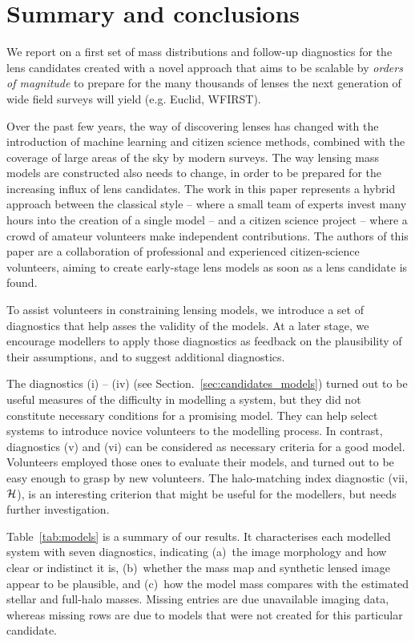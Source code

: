 
\section{Summary and conclusions}\label{sec:summary}


We report on a first set of mass distributions and follow-up
diagnostics for the {\SW} lens candidates created with a novel
approach that aims to be scalable by {\sl orders of magnitude} to
prepare for the many thousands of lenses the next generation of wide
field surveys will yield (e.g. Euclid, WFIRST).

Over the past few years, the way of discovering lenses has changed
with the introduction of machine learning and citizen science methods,
combined with the coverage of large areas of the sky by modern
surveys.  The way lensing mass models are constructed also needs to
change, in order to be prepared for the increasing influx of lens
candidates.  The work in this paper represents a hybrid approach
between the classical style -- where a small team of experts invest
many hours into the creation of a single model -- and a citizen
science project -- where a crowd of amateur volunteers make
independent contributions.  The authors of this paper are a
collaboration of professional and experienced citizen-science
volunteers, aiming to create early-stage lens models as soon as a lens
candidate is found.

To assist volunteers in constraining lensing models, we introduce a
set of diagnostics that help asses the validity of the models. At a
later stage, we encourage modellers to apply those diagnostics as
feedback on the plausibility of their assumptions, and to suggest
additional diagnostics.

The diagnostics (i) -- (iv) (see Section.~\ref{sec:candidates_models})
turned out to be useful measures of the difficulty in modelling a
system, but they did not constitute necessary conditions for a
promising model.  They can help select systems to introduce novice
volunteers to the modelling process. In contrast, diagnostics (v) and
(vi) can be considered as necessary criteria for a good model.
Volunteers employed those ones to evaluate their models, and turned out
to be easy enough to grasp by new volunteers.  The halo-matching
index diagnostic (vii, $\mathcal{H}$), is an interesting criterion that
might be useful for the modellers, but needs further investigation.


Table~\ref{tab:models} is a summary of our results.  It characterises
each modelled system with seven diagnostics, indicating (a)~the image
morphology and how clear or indistinct it is, (b)~whether the mass map
and synthetic lensed image appear to be plausible, and (c)~how the
model mass compares with the estimated stellar and full-halo masses.
Missing entries are due unavailable imaging data, whereas 
missing rows are due to models that were not created for this particular
candidate.

